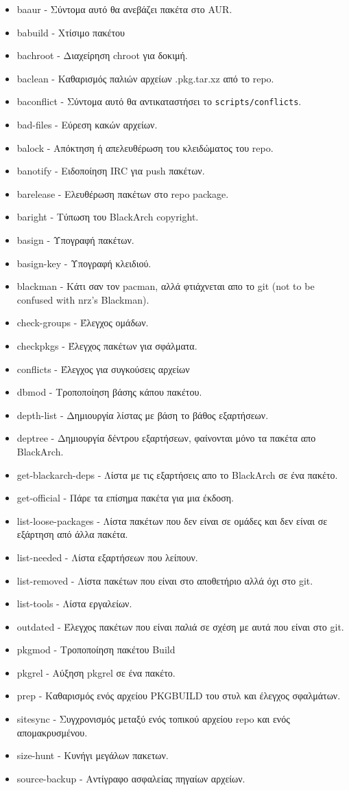 \documentclass[a4paper, oneside, 11pt]{book}
\begin{document}
\begin{itemize}
\item baaur - Σύντομα αυτό θα ανεβάζει πακέτα στο AUR.
\item babuild - Χτίσιμο πακέτου
\item bachroot - Διαχείρηση chroot για δοκιμή.
\item baclean - Καθαρισμός παλιών αρχείων .pkg.tar.xz από το repo.
\item baconflict - Σύντομα αυτό θα αντικαταστήσει το \verb|scripts/conflicts|.
\item bad-files - Εύρεση κακών αρχείων.
\item balock - Απόκτηση ή απελευθέρωση του κλειδώματος του repo.
\item banotify - Ειδοποίηση IRC για push πακέτων.
\item barelease - Ελευθέρωση πακέτων στο repo package.
\item baright - Τύπωση του BlackArch copyright.
\item basign - Υπογραφή πακέτων.
\item basign-key - Υπογραφή κλειδιού.
\item blackman - Κάτι σαν τον pacman, αλλά φτιάχνεται απο το git (not to be
    confused with nrz's Blackman).
\item check-groups - Έλεγχος ομάδων.
\item checkpkgs - Έλεγχος πακέτων για σφάλματα.
\item conflicts - Έλεγχος για συγκούσεις αρχείων
\item dbmod - Τροποποίηση βάσης κάπου πακέτου.
\item depth-list - Δημιουργία λίστας με βάση το βάθος εξαρτήσεων.
\item deptree - Δημιουργία δέντρου εξαρτήσεων, φαίνονται μόνο τα πακέτα απο BlackArch.
\item get-blackarch-deps - Λίστα με τις εξαρτήσεις απο το BlackArch σε ένα πακέτο.
\item get-official - Πάρε τα επίσημα πακέτα για μια έκδοση.
\item list-loose-packages - Λίστα πακέτων που δεν είναι σε ομάδες και δεν είναι σε εξάρτηση από άλλα πακέτα.
\item list-needed - Λίστα εξαρτήσεων που λείπουν.
\item list-removed - Λίστα πακέτων που είναι στο αποθετήριο αλλά όχι στο git.
\item list-tools - Λίστα εργαλείων.
\item outdated - Έλεγχος πακέτων που είναι παλιά σε σχέση με αυτά που είναι στο git.
\item pkgmod - Τροποποίηση πακέτου Build
\item pkgrel - Αύξηση pkgrel σε ένα πακέτο.
\item prep - Καθαρισμός ενός αρχείου PKGBUILD του στυλ και έλεγχος σφαλμάτων.
\item sitesync - Συγχρονισμός μεταξύ ενός τοπικού αρχείου repo και ενός απομακρυσμένου.
\item size-hunt - Κυνήγι μεγάλων πακετων.
\item source-backup - Αντίγραφο ασφαλείας πηγαίων αρχείων.
\end{itemize}
\end{document}
